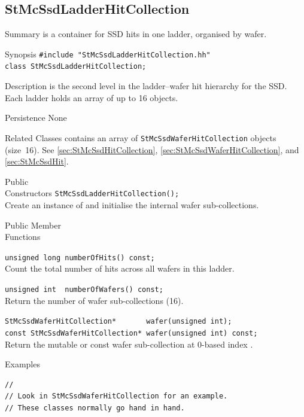 \subsection{StMcSsdLadderHitCollection}
 
\label{sec:StMcSsdLadderHitCollection}
\begin{Entry}
\item[Summary]
     is a container for SSD hits in one
    ladder, organised by wafer.

\item[Synopsis]
    \verb+#include "StMcSsdLadderHitCollection.hh"+\\
    \verb+class StMcSsdLadderHitCollection;+\\

\item[Description]
     is the second level in the
    ladder--wafer hit hierarchy for the SSD.  Each ladder holds an array of
    up to 16  objects.

\item[Persistence]
    None

\item[Related Classes]
     contains an array of
    {\tt StMcSsdWaferHitCollection} objects (size~16).  See
     \ref{sec:StMcSsdHitCollection},
     \ref{sec:StMcSsdWaferHitCollection},
    and  \ref{sec:StMcSsdHit}.

\item[Public\\ Constructors]
    \verb+StMcSsdLadderHitCollection();+\\
    Create an instance of  and
    initialise the internal wafer sub-collections.

\item[Public Member\\ Functions]

    \verb+unsigned long numberOfHits() const;+\\
    Count the total number of hits across all wafers in this ladder.

    \verb+unsigned int  numberOfWafers() const;+\\
    Return the number of wafer sub-collections (16).

    \verb+StMcSsdWaferHitCollection*       wafer(unsigned int);+\\
    \verb+const StMcSsdWaferHitCollection* wafer(unsigned int) const;+\\
    Return the mutable or const wafer sub-collection at 0-based index
    .

\item[Examples]
{\footnotesize
\begin{verbatim}
//
// Look in StMcSsdWaferHitCollection for an example.
// These classes normally go hand in hand.
\end{verbatim}
}%
\end{Entry}
\clearpage

